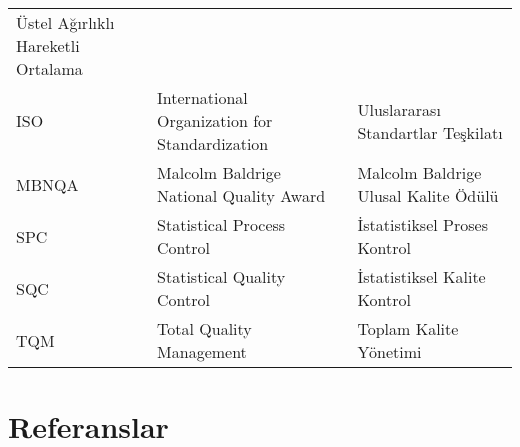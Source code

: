 \documentclass[
]{book}
\begin{document}
\begin{longtable}[]{@{}lll@{}}
\begin{minipage}[t]{0.31\columnwidth}
Üstel Ağırlıklı Hareketli Ortalama\strut
\end{minipage}\tabularnewline
\begin{minipage}[t]{0.31\columnwidth}\raggedright
ISO\strut
\end{minipage} & \begin{minipage}[t]{0.29\columnwidth}\raggedright
International Organization for Standardization\strut
\end{minipage} & \begin{minipage}[t]{0.31\columnwidth}\raggedright
Uluslararası Standartlar Teşkilatı\strut
\end{minipage}\tabularnewline
\begin{minipage}[t]{0.31\columnwidth}\raggedright
MBNQA\strut
\end{minipage} & \begin{minipage}[t]{0.29\columnwidth}\raggedright
Malcolm Baldrige National Quality Award\strut
\end{minipage} & \begin{minipage}[t]{0.31\columnwidth}\raggedright
Malcolm Baldrige Ulusal Kalite Ödülü\strut
\end{minipage}\tabularnewline
\begin{minipage}[t]{0.31\columnwidth}\raggedright
SPC\strut
\end{minipage} & \begin{minipage}[t]{0.29\columnwidth}\raggedright
Statistical Process Control\strut
\end{minipage} & \begin{minipage}[t]{0.31\columnwidth}\raggedright
İstatistiksel Proses Kontrol\strut
\end{minipage}\tabularnewline
\begin{minipage}[t]{0.31\columnwidth}\raggedright
SQC\strut
\end{minipage} & \begin{minipage}[t]{0.29\columnwidth}\raggedright
Statistical Quality Control\strut
\end{minipage} & \begin{minipage}[t]{0.31\columnwidth}\raggedright
İstatistiksel Kalite Kontrol\strut
\end{minipage}\tabularnewline
\begin{minipage}[t]{0.31\columnwidth}\raggedright
TQM\strut
\end{minipage} & \begin{minipage}[t]{0.29\columnwidth}\raggedright
Total Quality Management\strut
\end{minipage} & \begin{minipage}[t]{0.31\columnwidth}\raggedright
Toplam Kalite Yönetimi\strut
\end{minipage}\tabularnewline
\bottomrule
\end{longtable}

\hypertarget{referanslar}{%
\chapter*{Referanslar}\label{referanslar}}

  
\end{document}
